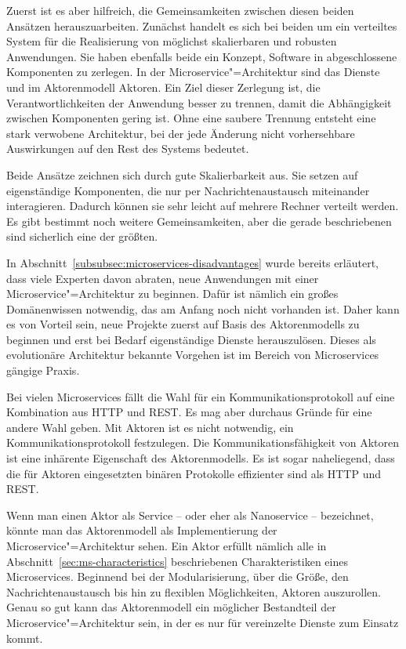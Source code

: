 Zuerst ist es aber hilfreich, die Gemeinsamkeiten zwischen diesen beiden Ansätzen herauszuarbeiten. Zunächst handelt es sich bei beiden um ein verteiltes System für die Realisierung von möglichst skalierbaren und robusten Anwendungen. Sie haben ebenfalls beide ein Konzept, Software in abgeschlossene Komponenten zu zerlegen. In der Microservice"=Architektur sind das Dienste und im Aktorenmodell Aktoren. Ein Ziel dieser Zerlegung ist, die Verantwortlichkeiten der Anwendung besser zu trennen, damit die Abhängigkeit zwischen Komponenten gering ist. Ohne eine saubere Trennung entsteht eine stark verwobene Architektur, bei der jede Änderung nicht vorhersehbare Auswirkungen auf den Rest des Systems bedeutet. 

Beide Ansätze zeichnen sich durch gute Skalierbarkeit aus. Sie setzen auf eigenständige Komponenten, die nur per Nachrichtenaustausch miteinander interagieren. Dadurch können sie sehr leicht auf mehrere Rechner verteilt werden. Es gibt bestimmt noch weitere Gemeinsamkeiten, aber die gerade beschriebenen sind sicherlich eine der größten. 

In Abschnitt~\ref{subsubsec:microservices-disadvantages} wurde bereits erläutert, dass viele Experten davon abraten, neue Anwendungen mit einer Microservice"=Architektur zu beginnen. Dafür ist nämlich ein großes Domänenwissen notwendig, das am Anfang noch nicht vorhanden ist. Daher kann es von Vorteil sein, neue Projekte zuerst auf Basis des Aktorenmodells zu beginnen und erst bei Bedarf eigenständige Dienste herauszulösen. Dieses als evolutionäre Architektur bekannte Vorgehen ist im Bereich von Microservices gängige Praxis. 

Bei vielen Microservices fällt die Wahl für ein Kommunikationsprotokoll auf eine Kombination aus HTTP und REST. Es mag aber durchaus Gründe für eine andere Wahl geben. Mit Aktoren ist es nicht notwendig, ein Kommunikationsprotokoll festzulegen. Die Kommunikationsfähigkeit von Aktoren ist eine inhärente Eigenschaft des Aktorenmodells. Es ist sogar naheliegend, dass die für Aktoren eingesetzten binären Protokolle effizienter sind als HTTP und REST.

Wenn man einen Aktor als Service -- oder eher als Nanoservice -- bezeichnet, könnte man das Aktorenmodell als Implementierung der Microservice"=Architektur sehen. Ein Aktor erfüllt nämlich alle in Abschnitt~\ref{sec:ms-characteristics} beschriebenen Charakteristiken eines Microservices. Beginnend bei der Modularisierung, über die Größe, den Nachrichtenaustausch bis hin zu flexiblen Möglichkeiten, Aktoren auszurollen. Genau so gut kann das Aktorenmodell ein möglicher Bestandteil der Microservice"=Architektur sein, in der es nur für vereinzelte Dienste zum Einsatz kommt.


